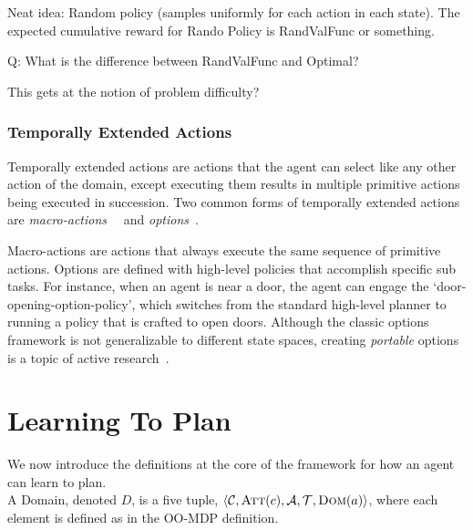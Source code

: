 \documentclass[11pt]{article}
\begin{document}
Neat idea: Random policy (samples uniformly for each action in each state). The expected cumulative reward for Rando Policy is RandValFunc or something.

Q: What is the difference between RandValFunc and Optimal?

This gets at the notion of problem difficulty?


\subsubsection{Temporally Extended Actions}


Temporally extended actions are actions that the agent can select like
any other action of the domain, except executing them results in
multiple primitive actions being executed in succession. Two common
forms of temporally extended actions are {\em
  macro-actions}~\cite{hauskrecht98} ~and {\em
  options}~\cite{sutton99}.  
  
  Macro-actions are actions that always
execute the same sequence of primitive actions. Options are defined
with high-level policies that accomplish specific sub tasks. For
instance, when an agent is near a door, the agent can engage the
`door-opening-option-policy', which switches from the standard
high-level planner to running a policy that is crafted to open doors.
Although the classic options framework is not generalizable to
different state spaces, creating {\em portable} options is a topic of
active
research~\cite{konidaris07,konidaris2009efficient,Ravindran03analgebraic,andre2002state,konidaris2012transfer}.




\section{Learning To Plan}
\label{sec:learning_to_plan}

We now introduce the definitions at the core of the framework for how an agent can learn to plan. \\
{ A \textup{Domain}, denoted $D$, is a five tuple, $\langle \mathcal{C}, \textsc{Att}(c), \mathcal{A}, \mathcal{T}, \textsc{Dom}(a) \rangle$, where each element is defined as in the OO-MDP definition.} 
\end{document}
